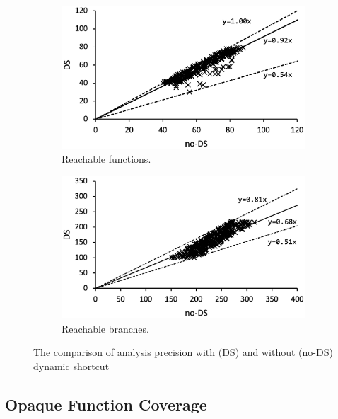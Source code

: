 \begin{figure}
  \centering
  \begin{subfigure}[t]{0.48\textwidth}
    \vspace*{-1em}
    \includegraphics[width=\linewidth]{img/precision-func}
    \caption{Reachable functions.}
    \label{fig:precision-func}
  \end{subfigure}
  \begin{subfigure}[t]{0.48\textwidth}
    \includegraphics[width=\linewidth]{img/precision-branch}
    \caption{Reachable branches.}
    \label{fig:abs-analysis-ratio}
  \end{subfigure}
  \caption{The comparison of analysis precision with (DS) and without (no-DS)
  dynamic shortcut}
  \label{fig:precision}
  \vspace*{-1.5em}
\end{figure}

\todo


\subsection{Opaque Function Coverage}

\todo
